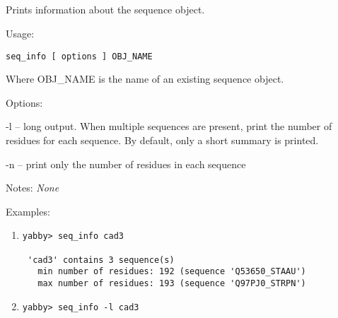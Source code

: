 

\subsection[seq\_info]{  }



Prints information about the sequence object.


\begin{description}


\item{Usage:}

{\tt seq\_info [ options ] OBJ\_NAME}

Where OBJ\_NAME is the name of an existing sequence object.


\item{Options:}
\begin{description}
\item -l -- long output.  When multiple sequences are present,
            print the number of residues for each sequence.
            By default, only a short summary is printed.
\item -n -- print only the number of residues in each sequence
\end{description}


\item{Notes:} {\em None}


\item{Examples:}
\begin{enumerate}

\item
\begin{verbatim}
yabby> seq_info cad3

 'cad3' contains 3 sequence(s)
   min number of residues: 192 (sequence 'Q53650_STAAU')
   max number of residues: 193 (sequence 'Q97PJ0_STRPN')

\end{verbatim}

\item
\begin{verbatim}
yabby> seq_info -l cad3


\end{verbatim}
\end{enumerate}
\end{description}
